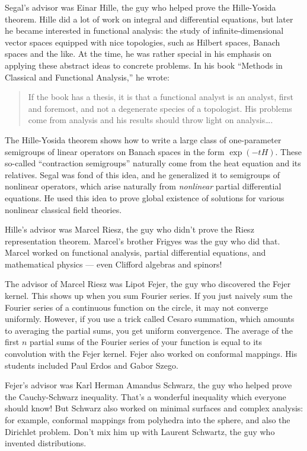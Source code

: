 \documentclass{article}
\begin{document}
Segal's advisor was Einar Hille, the guy who helped prove the
Hille-Yosida theorem. Hille did a lot of work on integral and
differential equations, but later he became interested in functional
analysis: the study of infinite-dimensional vector spaces equipped with
nice topologies, such as Hilbert spaces, Banach spaces and the like. At
the time, he was rather special in his emphasis on applying these
abstract ideas to concrete problems. In his book ``Methods in Classical
and Functional Analysis,'' he wrote:

\begin{quote}
If the book has a thesis, it is that a functional analyst is an analyst,
first and foremost, and not a degenerate species of a topologist. His
problems come from analysis and his results should throw light on
analysis\ldots.
\end{quote}

The Hille-Yosida theorem shows how to write a large class of
one-parameter semigroups of linear operators on Banach spaces in the
form \(\exp(-tH)\). These so-called ``contraction semigroups'' naturally
come from the heat equation and its relatives. Segal was fond of this
idea, and he generalized it to semigroups of nonlinear operators, which
arise naturally from \emph{nonlinear} partial differential equations. He
used this idea to prove global existence of solutions for various
nonlinear classical field theories.

Hille's advisor was Marcel Riesz, the guy who didn't prove the Riesz
representation theorem. Marcel's brother Frigyes was the guy who did
that. Marcel worked on functional analysis, partial differential
equations, and mathematical physics --- even Clifford algebras and
spinors!

The advisor of Marcel Riesz was Lipot Fejer, the guy who discovered the
Fejer kernel. This shows up when you sum Fourier series. If you just
naively sum the Fourier series of a continuous function on the circle,
it may not converge uniformly. However, if you use a trick called Cesaro
summation, which amounts to averaging the partial sums, you get uniform
convergence. The average of the first \(n\) partial sums of the Fourier
series of your function is equal to its convolution with the Fejer
kernel. Fejer also worked on conformal mappings. His students included
Paul Erdos and Gabor Szego.

Fejer's advisor was Karl Herman Amandus Schwarz, the guy who helped
prove the Cauchy-Schwarz inequality. That's a wonderful inequality which
everyone should know! But Schwarz also worked on minimal surfaces and
complex analysis: for example, conformal mappings from polyhedra into
the sphere, and also the Dirichlet problem. Don't mix him up with
Laurent Schwartz, the guy who invented distributions.
\end{document}
